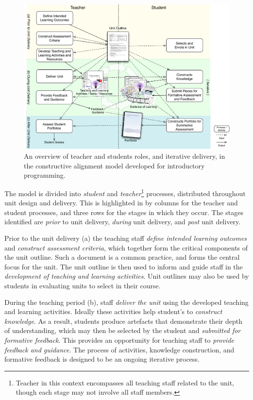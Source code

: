 \begin{figure}[t!]
	\centering
	\includegraphics[width=6in]{ProcessOverview}
	\caption{An overview of teacher and students roles, and iterative delivery, in the constructive alignment model developed for introductory programming.}
	\label{fig:process_overview}
\end{figure}

The model is divided into \emph{student} and \emph{teacher}\footnote{Teacher in this context encompasses all teaching staff related to the unit, though each stage may not involve all staff members.} processes, distributed throughout unit design and delivery. This is highlighted in  by columns for the teacher and student processes, and three rows for the stages in which they occur. The stages identified are \emph{prior} to unit delivery, \emph{during} unit delivery, and \emph{post} unit delivery.

Prior to the unit delivery (a) the teaching staff \emph{define intended learning outcomes} and \emph{construct assessment criteria}, which together form the critical components of the unit outline. Such a document is a common practice, and forms the central focus for the unit. The unit outline is then used to inform and guide staff in the \emph{development of teaching and learning activities}. Unit outlines may also be used by students in evaluating units to select in their course.

During the teaching period (b), staff \emph{deliver the unit} using the developed teaching and learning activities. Ideally these activities help student's to \emph{construct knowledge}. As a result, students produce artefacts that demonstrate their depth of understanding, which may then be selected by the student and \emph{submitted for formative feedback}. This provides an opportunity for teaching staff to \emph{provide feedback and guidance}. The process of activities, knowledge construction, and formative feedback is designed to be an ongoing iterative process.

